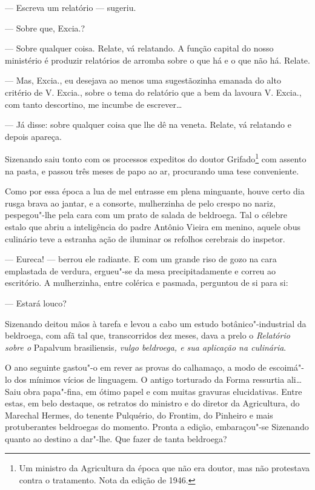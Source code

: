 --- Escreva um relatório --- sugeriu.

--- Sobre que, Excia.?

--- Sobre qualquer coisa. Relate, vá relatando. A função capital do
nosso ministério é produzir relatórios de arromba sobre o que há e o que
não há. Relate.

--- Mas, Excia., eu desejava ao menos uma sugestãozinha emanada do alto
critério de V. Excia., sobre o tema do relatório que a bem da lavoura V.
Excia., com tanto descortino, me incumbe de escrever\ldots{}

--- Já disse: sobre qualquer coisa que lhe dê na veneta. Relate, vá
relatando e depois apareça.

Sizenando saiu tonto com os processos expeditos do doutor
Grifado\footnote{Um ministro da Agricultura da época que não era doutor,
  mas não protestava contra o tratamento. Nota da edição de 1946.} com
assento na pasta, e passou três meses de papo ao ar, procurando uma tese
conveniente.

Como por essa época a lua de mel entrasse em plena minguante, houve
certo dia rusga brava ao jantar, e a consorte, mulherzinha de pelo
crespo no nariz, pespegou"-lhe pela cara com um prato de salada de
beldroega. Tal o célebre estalo que abriu a inteligência do padre
Antônio Vieira em menino, aquele obus culinário teve a estranha ação de
iluminar os refolhos cerebrais do inspetor.

--- Eureca! --- berrou ele radiante. E com um grande riso de gozo na
cara emplastada de verdura, ergueu"-se da mesa precipitadamente e correu
ao escritório. A mulherzinha, entre colérica e pasmada, perguntou de si
para si:

--- Estará louco?

Sizenando deitou mãos à tarefa e levou a cabo um estudo
botânico"-industrial da beldroega, com afã tal que, transcorridos dez
meses, dava a prelo o \emph{Relatório sobre o} Papalvum
brasiliensis\emph{, vulgo beldroega, e sua aplicação na culinária}.

O ano seguinte gastou"-o em rever as provas do calhamaço, a modo de
escoimá"-lo dos mínimos vícios de linguagem. O antigo torturado da Forma
ressurtia ali\ldots{} Saiu obra papa"-fina, em ótimo papel e com muitas
gravuras elucidativas. Entre estas, em belo destaque, os retratos do
ministro e do diretor da Agricultura, do Marechal Hermes, do tenente
Pulquério, do Frontim, do Pinheiro e mais protuberantes beldroegas do
momento. Pronta a edição, embaraçou"-se Sizenando quanto ao destino a
dar"-lhe. Que fazer de tanta beldroega?

